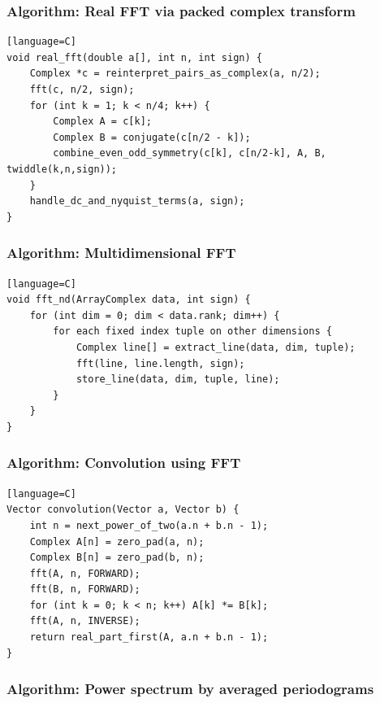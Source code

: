 \documentclass[11pt]{article}
\begin{document}
\subsubsection{Algorithm: Real FFT via packed complex transform}\label{algorithm-real-fft-via-packed-complex-transform}

\begin{verbatim}[language=C]
void real_fft(double a[], int n, int sign) {
    Complex *c = reinterpret_pairs_as_complex(a, n/2);
    fft(c, n/2, sign);
    for (int k = 1; k < n/4; k++) {
        Complex A = c[k];
        Complex B = conjugate(c[n/2 - k]);
        combine_even_odd_symmetry(c[k], c[n/2-k], A, B, twiddle(k,n,sign));
    }
    handle_dc_and_nyquist_terms(a, sign);
}
\end{verbatim}

\subsubsection{Algorithm: Multidimensional FFT}\label{algorithm-multidimensional-fft}

\begin{verbatim}[language=C]
void fft_nd(ArrayComplex data, int sign) {
    for (int dim = 0; dim < data.rank; dim++) {
        for each fixed index tuple on other dimensions {
            Complex line[] = extract_line(data, dim, tuple);
            fft(line, line.length, sign);
            store_line(data, dim, tuple, line);
        }
    }
}
\end{verbatim}

\subsubsection{Algorithm: Convolution using FFT}\label{algorithm-convolution-using-fft}

\begin{verbatim}[language=C]
Vector convolution(Vector a, Vector b) {
    int n = next_power_of_two(a.n + b.n - 1);
    Complex A[n] = zero_pad(a, n);
    Complex B[n] = zero_pad(b, n);
    fft(A, n, FORWARD);
    fft(B, n, FORWARD);
    for (int k = 0; k < n; k++) A[k] *= B[k];
    fft(A, n, INVERSE);
    return real_part_first(A, a.n + b.n - 1);
}
\end{verbatim}

\subsubsection{Algorithm: Power spectrum by averaged periodograms}\label{algorithm-power-spectrum-by-averaged-periodograms}
\end{document}

